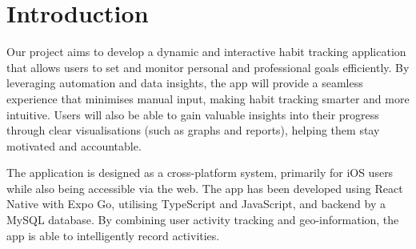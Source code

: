 \chapter{Introduction}
\label{chap:introduction}
Our project aims to develop a dynamic and interactive habit tracking application that allows users to set and monitor personal and professional goals efficiently. By leveraging automation and data insights, the app will provide a seamless experience that minimises manual input, making habit tracking smarter and more intuitive. Users will also be able to gain valuable insights into their progress through clear visualisations (such as graphs and reports), helping them stay motivated and accountable.

The application is designed as a cross-platform system, primarily for iOS users while also being accessible via the web. The app has been developed using React Native with Expo Go, utilising TypeScript and JavaScript, and backend by a MySQL database. By combining user activity tracking and geo-information, the app is able to intelligently record activities.

